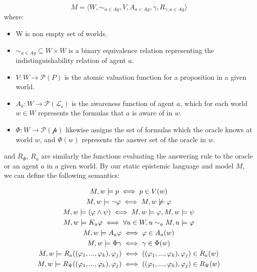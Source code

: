 $$
	M = \langle W, \sim_{a\in Ag}, V, A_{a\in Ag}, \gamma, R_{\gamma,a\in Ag}\rangle
$$
where: 
\begin{itemize}
	\setlength\itemsep{-0.4em}
	\item W is non empty set of worlds.
	\item $\sim_{a\in Ag} \subseteq W \times W$ is a binary equivalence relation representing the indistinguishability relation of agent $a$. 
	\item $V : W \rightarrow \mathscr{P}(P)$ is the atomic valuation function for a proposition in a given world.
	\item $A_a : W \rightarrow \mathscr{P}(\mathscr{L_s})$ is the awareness function of agent $a$, which for each world $w \in W$ represents the formulas that $a$ is aware of in $w$.
	\item $\Phi : W \rightarrow \mathscr{P}(\mathscr{p}) $ likewise assigns the set of formulas which the oracle knows at world $w$, and $\Phi(w)$ represents the answer set of the oracle in $w$.
\end{itemize}
and $R_{\Phi}$, $R_{a}$ are similarly the functions evaluating the answering rule to the oracle or an agent $a$ in a given world. By our static epistemic language \staticlang and model $M$, we can define the following semantics:

\begin{gather*}
	M, w |= p \iff p \in V(w) \\
	M, w |= \neg\varphi \iff M, w \not\models \varphi\\
	M, w |= (\varphi \land \psi) \iff M, w |= \varphi, M, w |= \psi \\
	M, w |= K_a\varphi \iff \forall u\in W, u \sim_{a} M, u |= \varphi \\
	M, w |= A_a\varphi \iff \varphi \in A_a(w) \\
	M, w |= \Phi\gamma \iff \gamma \in \Phi(w) \\
	M, w |= R_a((\varphi_1,...,\varphi_k), \varphi_j) \iff ((\varphi_1,...,\varphi_k), \varphi_j) \in R_a(w) \\
	M, w |= R_\Psi((\varphi_1,...,\varphi_k), \varphi_j) \iff ((\varphi_1,...,\varphi_k), \varphi_j) \in R_\Psi(w)
\end{gather*}

